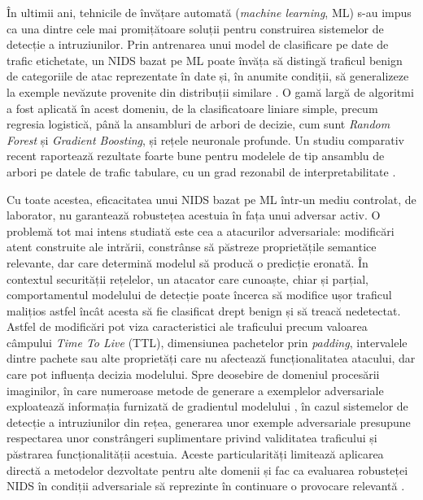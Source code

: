 În ultimii ani, tehnicile de învățare automată (\textit{machine learning}, ML) s-au impus ca una dintre cele mai promițătoare soluții pentru construirea sistemelor de detecție a intruziunilor. Prin antrenarea unui model de clasificare pe date de trafic etichetate, un NIDS bazat pe ML poate învăța să distingă traficul benign de categoriile de atac reprezentate în date și, în anumite condiții, să generalizeze la exemple nevăzute provenite din distribuții similare \cite{agarwal2021classification}. O gamă largă de algoritmi a fost aplicată în acest domeniu, de la clasificatoare liniare simple, precum regresia logistică, până la ansambluri de arbori de decizie, cum sunt \textit{Random Forest} și \textit{Gradient Boosting}, și rețele neuronale profunde. Un studiu comparativ recent raportează rezultate foarte bune pentru modelele de tip ansamblu de arbori pe datele de trafic tabulare, cu un grad rezonabil de interpretabilitate \cite{alhameed2025enhancing}.

Cu toate acestea, eficacitatea unui NIDS bazat pe ML într-un mediu controlat, de laborator, nu garantează robustețea acestuia în fața unui adversar activ. O problemă tot mai intens studiată este cea a atacurilor adversariale: modificări atent construite ale intrării, constrânse să păstreze proprietățile semantice relevante, dar care determină modelul să producă o predicție eronată. În contextul securității rețelelor, un atacator care cunoaște, chiar și parțial, comportamentul modelului de detecție poate încerca să modifice ușor traficul malițios astfel încât acesta să fie clasificat drept benign și să treacă nedetectat. Astfel de modificări pot viza caracteristici ale traficului precum valoarea câmpului \textit{Time To Live} (TTL), dimensiunea pachetelor prin \textit{padding}, intervalele dintre pachete sau alte proprietăți care nu afectează funcționalitatea atacului, dar care pot influența decizia modelului. Spre deosebire de domeniul procesării imaginilor, în care numeroase metode de generare a exemplelor adversariale exploatează informația furnizată de gradientul modelului \cite{goodfellow2015explaining}, în cazul sistemelor de detecție a intruziunilor din rețea, generarea unor exemple adversariale presupune respectarea unor constrângeri suplimentare privind validitatea traficului și păstrarea funcționalității acestuia. Aceste particularități limitează aplicarea directă a metodelor dezvoltate pentru alte domenii și fac ca evaluarea robusteței NIDS în condiții adversariale să reprezinte în continuare o provocare relevantă \cite{he2023adversarial, alotaibi2023adversarial}.

